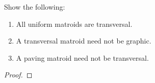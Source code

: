 \prob
{
    Show the following:
    \begin{enumerate}[label=(\roman*)]
        \item   All uniform matroids are transversal.
        \item   A transversal matroid need not be graphic.
        \item   A paving matroid need not be transversal.
    \end{enumerate}
}
\begin{proof}

\end{proof}